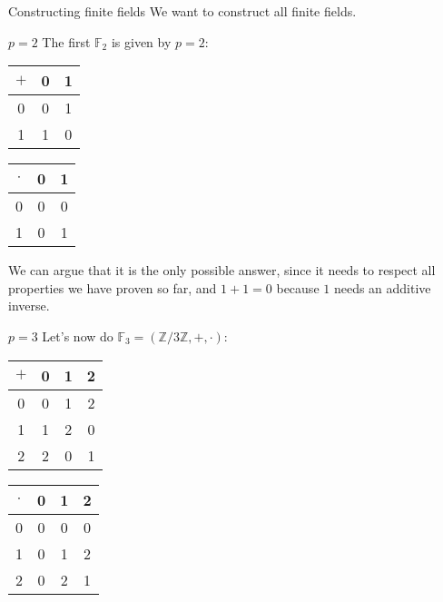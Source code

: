 \documentclass[a4paper]{article}
\begin{document}
\begin{parag}{Constructing finite fields}
    We want to construct all finite fields.

    \begin{subparag}{$p = 2$}
        The first $\mathbb{F}_2$ is given by $p = 2$:
        \begin{center}
            \begin{tabular}{c|cc}
                $+$ & 0 & 1 \\
                \hline
                0 & 0 & 1 \\
                1 & 1 & 0
            \end{tabular}
            \hspace{1em}
            \begin{tabular}{c|cc}
                $\cdot$ & 0 & 1 \\
                \hline
                0 & 0 & 0 \\
                1 & 0 & 1
            \end{tabular}
        \end{center}

        We can argue that it is the only possible answer, since it needs to respect all properties we have proven so far, and $1 + 1 = 0$ because $1$ needs an additive inverse.
    \end{subparag}
    
    \begin{subparag}{$p = 3$}
        Let's now do $\mathbb{F}_3 = \left(\mathbb{Z} / 3\mathbb{Z}, +, \cdot\right)$: 
        \begin{center}
            \begin{tabular}{c|ccc}
                $+$ & 0 & 1 & 2\\
                \hline
                0 & 0 & 1 & 2\\
                1 & 1 & 2 & 0 \\
                2 & 2 & 0 & 1
            \end{tabular}
            \hspace{1em}
            \begin{tabular}{c|ccc}
                $\cdot$ & 0 & 1 & 2\\
                \hline
                0 & 0 & 0 & 0\\
                1 & 0 & 1 & 2 \\
                2 & 0 & 2 & 1
            \end{tabular}
        \end{center}


\end{subparag}
\end{parag}
\end{document}
